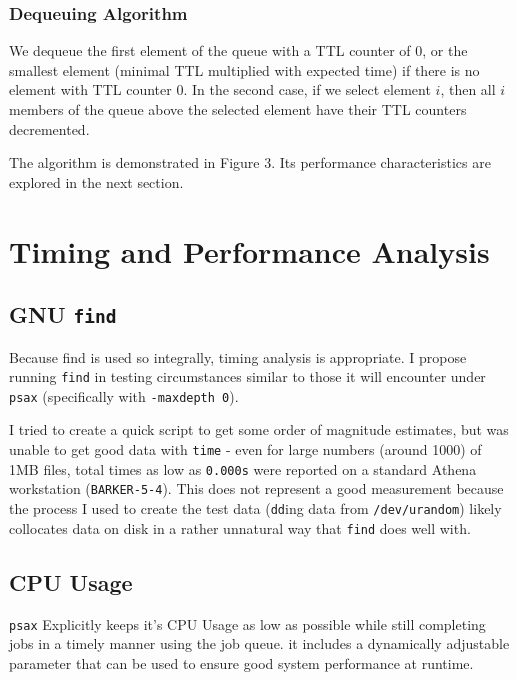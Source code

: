 \documentclass[a4paper]{report}
\newcommand{\inlinecode}{\texttt}
\begin{document}
\subsubsection{Dequeuing Algorithm}

We dequeue the first element of the queue with a TTL counter of $0$, or the smallest element (minimal TTL multiplied with expected time) if there is no element with TTL counter $0$. In the second case, if we select element $i$, then all $i$ members of the queue above the selected element have their TTL counters decremented.

The algorithm is demonstrated in Figure 3. Its performance characteristics are explored in the next section.

\section{Timing and Performance Analysis}

\subsection{GNU \inlinecode{find}}

Because find is used so integrally, timing analysis is appropriate. I propose running \inlinecode{find} in testing circumstances similar to those it will encounter under \inlinecode{psax} (specifically with \inlinecode{-maxdepth 0}).

I tried to create a quick script to get some order of magnitude estimates, but was unable to get good data with \inlinecode{time} - even for large numbers (around 1000) of 1MB files, total times as low as \inlinecode{0.000s} were reported on a standard Athena workstation (\inlinecode{BARKER-5-4}). This does not represent a good measurement because the process I used to create the test data (\inlinecode{dd}ing data from \inlinecode{/dev/urandom}) likely collocates data on disk in a rather unnatural way that \inlinecode{find} does well with.

\subsection{CPU Usage}

\inlinecode{psax} Explicitly keeps it's CPU Usage as low as possible while still completing jobs in a timely manner using the job queue. it includes a dynamically adjustable parameter that can be used to ensure good system performance at runtime.
\end{document}
